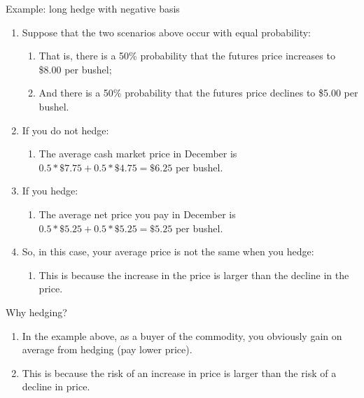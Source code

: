 \documentclass[table,xcolor=pdftex,dvipsnames]{beamer}\usepackage[]{graphicx}\usepackage[]{color}
\begin{document}

\begin{frame}{Example: long hedge with negative basis}
\begin{enumerate}[label=\textbullet]
  \item Suppose that the two scenarios above occur with equal probability:
      \begin{enumerate}[label=-]
            \item That is, there is a 50\% probability that the futures price increases to \$8.00 per bushel;
            \item And there is a 50\% probability that the futures price declines to \$5.00 per bushel.
      \end{enumerate}
  \item If you do not hedge:
      \begin{enumerate}[label=-]
            \item The average cash market price in December is $0.5*\$7.75+0.5*\$4.75 = \$6.25$ per bushel.
      \end{enumerate}
  \item If you hedge:
      \begin{enumerate}[label=-]
            \item The average net price you pay in December is $0.5*\$5.25+0.5*\$5.25 = \$5.25$ per bushel.
      \end{enumerate}
  \item So, in this case, your average price is not the same when you hedge:
      \begin{enumerate}[label=-]
            \item This is because the increase in the price is larger than the decline in the price.
      \end{enumerate}
\end{enumerate}
\end{frame}


\begin{frame}{Why hedging?}
\begin{enumerate}[label=\textbullet]
  \item In the example above, as a buyer of the commodity, you obviously gain on average from hedging (pay lower price).
  \item This is because the risk of an increase in price is larger than the risk of a decline in price.
\end{enumerate}
\end{frame}
\end{document}
